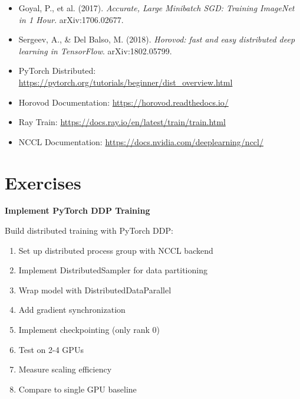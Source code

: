 \begin{itemize}
    \item Goyal, P., et al. (2017). \textit{Accurate, Large Minibatch SGD: Training ImageNet in 1 Hour}. arXiv:1706.02677.
    \item Sergeev, A., \& Del Balso, M. (2018). \textit{Horovod: fast and easy distributed deep learning in TensorFlow}. arXiv:1802.05799.
    \item PyTorch Distributed: \url{https://pytorch.org/tutorials/beginner/dist_overview.html}
    \item Horovod Documentation: \url{https://horovod.readthedocs.io/}
    \item Ray Train: \url{https://docs.ray.io/en/latest/train/train.html}
    \item NCCL Documentation: \url{https://docs.nvidia.com/deeplearning/nccl/}
\end{itemize}

\section{Exercises}

\begin{exercise}
\textbf{Implement PyTorch DDP Training}

Build distributed training with PyTorch DDP:

\begin{enumerate}
    \item Set up distributed process group with NCCL backend
    \item Implement DistributedSampler for data partitioning
    \item Wrap model with DistributedDataParallel
    \item Add gradient synchronization
    \item Implement checkpointing (only rank 0)
    \item Test on 2-4 GPUs
    \item Measure scaling efficiency
    \item Compare to single GPU baseline
\end{enumerate}
\end{exercise}

